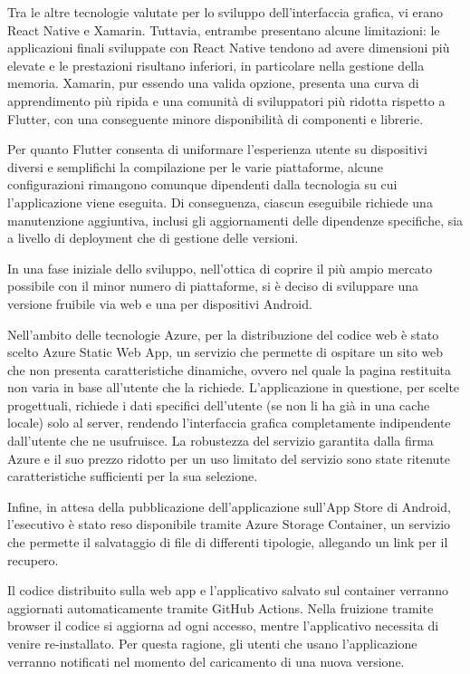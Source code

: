 Tra le altre tecnologie valutate per lo sviluppo dell'interfaccia grafica, vi erano React Native e Xamarin. Tuttavia, entrambe presentano alcune limitazioni: le applicazioni finali sviluppate con React Native tendono ad avere dimensioni più elevate e le prestazioni risultano inferiori, in particolare nella gestione della memoria. Xamarin, pur essendo una valida opzione, presenta una curva di apprendimento più ripida e una comunità di sviluppatori più ridotta rispetto a Flutter, con una conseguente minore disponibilità di componenti e librerie.

Per quanto Flutter consenta di uniformare l'esperienza utente su dispositivi diversi e semplifichi la compilazione per le varie piattaforme, alcune configurazioni rimangono comunque dipendenti dalla tecnologia su cui l'applicazione viene eseguita. Di conseguenza, ciascun eseguibile richiede una manutenzione aggiuntiva, inclusi gli aggiornamenti delle dipendenze specifiche, sia a livello di deployment che di gestione delle versioni.

In una fase iniziale dello sviluppo, nell'ottica di coprire il più ampio mercato possibile con il minor numero di piattaforme, si è deciso di sviluppare una versione fruibile via web e una per dispositivi Android.

 Nell'ambito delle tecnologie Azure, per la  distribuzione del codice web è stato scelto Azure Static Web App, un servizio che permette di ospitare un sito web che non presenta caratteristiche dinamiche, ovvero nel quale la pagina restituita non varia in base all’utente che la richiede. L’applicazione in questione, per scelte progettuali, richiede i dati specifici dell’utente (se non li ha già in una cache locale) solo al server, rendendo l’interfaccia grafica completamente indipendente dall’utente che ne usufruisce.
La robustezza del servizio garantita dalla firma Azure e il suo prezzo ridotto per un uso limitato del servizio sono state ritenute caratteristiche sufficienti per la sua selezione.

Infine, in attesa della pubblicazione dell’applicazione sull’App Store di Android, l’esecutivo è stato reso disponibile tramite Azure Storage Container, un servizio che permette il salvataggio di file di differenti tipologie, allegando un link per il recupero. 

Il codice distribuito sulla web app e l'applicativo salvato sul container verranno aggiornati automaticamente tramite GitHub Actions.
Nella fruizione tramite browser il codice si aggiorna ad ogni accesso, mentre l'applicativo necessita di venire re-installato. Per questa ragione, gli utenti che usano l'applicazione verranno notificati nel momento del caricamento di una nuova versione.

